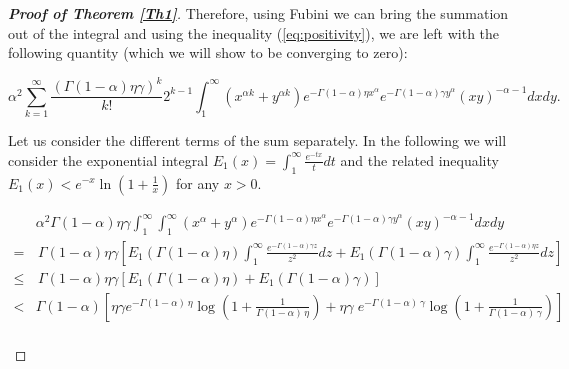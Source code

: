 \documentclass[11pt, reqno]{amsart}
\numberwithin{equation}{section}
\theoremstyle{plain} %
\theoremstyle{definition} %
\begin{document}
\begin{proof}[{\bf Proof of Theorem \ref{Th1}}]
Therefore, using Fubini we can bring the summation out of the integral and using the inequality (\ref{eq:positivity}), we are left with the following quantity (which we will show to be converging to zero):

\begin{equation}
    \alpha ^2 \sum_{k = 1}^{\infty} \frac{\left(  \Gamma(1-\alpha) \eta\gamma \right)^k}{k!} 2^{k-1} \int^{\infty}_{1}   \left( x^{\alpha k} + y^{\alpha k}  \right)      e^{-  \Gamma(1-\alpha) \eta x^{\alpha}} e^{-    \Gamma(1-\alpha) \gamma y^{\alpha}}  (xy)^{-\alpha -1} dx dy.
\end{equation}

Let us consider the different terms of the sum separately. 
In the following we will consider the exponential integral $E_1(x)= \int_1^\infty \frac{e^{-tx}}{t} dt$ and the related inequality $E_1(x) < e^{-x} \ln (1+\frac{1}{x})$ for any $x>0$.


\begin{align*}
&\alpha^2  \Gamma(1-\alpha) \eta \gamma   \int^{\infty}_{1} \int^{\infty}_{1}  \left( x^{\alpha} + y^{\alpha}  \right)      e^{-   \Gamma(1-\alpha) \eta x^{\alpha}} e^{-    \Gamma(1-\alpha) \gamma y^{\alpha}}  (xy)^{-\alpha -1} dx dy  \\
    = &  \,  \Gamma(1-\alpha) \eta \gamma   \left[     E_1\left(  \Gamma(1-\alpha) \eta   \right) \int^{\infty}_{1} \frac{e^{-  \Gamma(1-\alpha) \gamma   z }}{z^2} dz  + E_1\left(    \Gamma(1-\alpha)   \gamma  \right) \int^{\infty}_{1} \frac{e^{-   \Gamma(1-\alpha)   \eta   z }}{z^2} dz   \right]\\ 
     \leq & \,   \Gamma(1-\alpha) \eta \gamma   \left[     E_1\left( \Gamma(1-\alpha)   \eta  \right)  +   E_1\left(   \Gamma(1-\alpha) \gamma  \right)  \right]\\ 
     < &    \Gamma(1-\alpha)   \left[  \eta \gamma     e^{-  \Gamma(1-\alpha) \, \eta} \log{\left(1+\frac{1}{ \Gamma(1-\alpha)  \, \eta}\right)}  + \eta \gamma \; e^{-  \Gamma(1-\alpha)  \, \gamma} \log{\left(1+\frac{1}{ \Gamma(1-\alpha)  \, \gamma}\right)} \right]
     \end{align*}\\
     

\end{proof}
\end{document}

